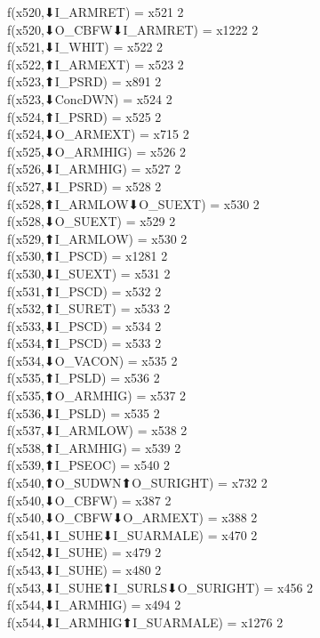 f(x520,⬇I_ARMRET) = x521 {2} \\
f(x520,⬇O_CBFW⬇I_ARMRET) = x1222 {2} \\
f(x521,⬇I_WHIT) = x522 {2} \\
f(x522,⬆I_ARMEXT) = x523 {2} \\
f(x523,⬆I_PSRD) = x891 {2} \\
f(x523,⬇ConcDWN) = x524 {2} \\
f(x524,⬆I_PSRD) = x525 {2} \\
f(x524,⬇O_ARMEXT) = x715 {2} \\
f(x525,⬇O_ARMHIG) = x526 {2} \\
f(x526,⬇I_ARMHIG) = x527 {2} \\
f(x527,⬇I_PSRD) = x528 {2} \\
f(x528,⬆I_ARMLOW⬇O_SUEXT) = x530 {2} \\
f(x528,⬇O_SUEXT) = x529 {2} \\
f(x529,⬆I_ARMLOW) = x530 {2} \\
f(x530,⬆I_PSCD) = x1281 {2} \\
f(x530,⬇I_SUEXT) = x531 {2} \\
f(x531,⬆I_PSCD) = x532 {2} \\
f(x532,⬆I_SURET) = x533 {2} \\
f(x533,⬇I_PSCD) = x534 {2} \\
f(x534,⬆I_PSCD) = x533 {2} \\
f(x534,⬇O_VACON) = x535 {2} \\
f(x535,⬆I_PSLD) = x536 {2} \\
f(x535,⬆O_ARMHIG) = x537 {2} \\
f(x536,⬇I_PSLD) = x535 {2} \\
f(x537,⬇I_ARMLOW) = x538 {2} \\
f(x538,⬆I_ARMHIG) = x539 {2} \\
f(x539,⬆I_PSEOC) = x540 {2} \\
f(x540,⬆O_SUDWN⬆O_SURIGHT) = x732 {2} \\
f(x540,⬇O_CBFW) = x387 {2} \\
f(x540,⬇O_CBFW⬇O_ARMEXT) = x388 {2} \\
f(x541,⬇I_SUHE⬇I_SUARMALE) = x470 {2} \\
f(x542,⬇I_SUHE) = x479 {2} \\
f(x543,⬇I_SUHE) = x480 {2} \\
f(x543,⬇I_SUHE⬆I_SURLS⬇O_SURIGHT) = x456 {2} \\
f(x544,⬇I_ARMHIG) = x494 {2} \\
f(x544,⬇I_ARMHIG⬆I_SUARMALE) = x1276 {2} \\
